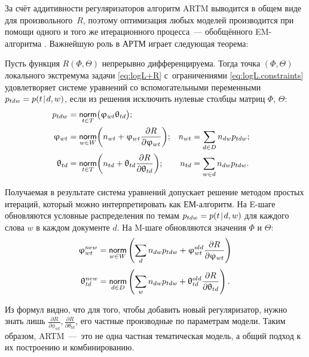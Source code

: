 За счёт аддитивности регуляризаторов алгоритм ARTM  выводится в общем виде для произвольного~$R$, поэтому оптимизация любых моделей  производится при помощи одного и того же итерационного процесса~--- обобщённого EM-алгоритма  \cite{vorontsov2014additive,vorontsov2015}. Важнейшую роль в АРТМ играет следующая теорема:
\begin{Theorem}
\label{th:ARTM}
    Пусть функция $R(\Phi,\Theta)$ непрерывно дифференцируема.
    Тогда точка $(\Phi,\Theta)$ локального экстремума задачи
    \eqref{eq:logL+R} с~ограничениями \eqref{eq:logL.constraints}
    удовлетворяет системе уравнений со вспомогательными переменными $p_{tdw}=p(t\mspace{2mu}{|}\mspace{2mu} d,w)$,
    если из решения исключить нулевые столбцы матриц $\Phi$, $\Theta$:
    \begin{align}
    \label{eq:ARTM.Estep}
        p_{tdw} &=\mathop{\mathsf{norm}}\limits_{t\in T} \bigl( \upvarphi_{wt}\uptheta_{td} \bigr);
    \\\label{eq:ARTM.Mstep.phi}
        \upvarphi_{wt} &=\mathop{\mathsf{norm}}\limits_{w\in W}
            \biggl(
                n_{wt} + \upvarphi_{wt} \frac{\partial R}{\partial \upvarphi_{wt}}
            \biggr);
        &
        n_{wt} &= \sum_{d\in D} n_{dw}p_{tdw};&
    \\\label{eq:ARTM.Mstep.theta}
        \uptheta_{td} &=\mathop{\mathsf{norm}}\limits_{t\in T}
            \biggl(
                n_{td} + \uptheta_{td} \frac{\partial R}{\partial \uptheta_{td}}
            \biggr);
        &
        n_{td} &= \sum_{w\in d} n_{dw}p_{tdw}.&
    \end{align}
\end{Theorem}

Получаемая в результате система уравнений допускает решение методом простых итераций, который можно интерпретировать как ЕМ-алгоритм. На E-шаге обновляются условные распределения по темам $p_{tdw}=p(t\mspace{2mu}{|}\mspace{2mu} d,w)$ для каждого слова $w$ в каждом документе $d$. На M-шаге обновляются значения $\Phi$ и $\Theta$:
\begin{equation} \label{eq:Mstep_Theta}
\upvarphi_{wt}^{new} =\mathop{\mathsf{norm}}\limits_{w\in W} \left( \sum_{d} n_{dw} p_{tdw} + \upvarphi_{wt}^{old} \frac{\partial{R}}{\partial{\ensuremath{\upvarphi}_{wt}}}\right)
\end{equation}
\[
\uptheta_{td}^{new}   =\mathop{\mathsf{norm}}\limits_{d\in D} \left( \sum_{w} n_{dw} p_{tdw} + \uptheta_{td}^{old} \frac{\partial{R}}{\partial{\uptheta_{td}}}\right).
\]
 
Из формул видно, что для того, чтобы добавить новый регуляризатор, нужно знать лишь $\frac{\partial{R}}{\partial{\phi_{wt}}}, \frac{\partial{R}}{\partial{\theta_{td}}}$, его частные производные по параметрам модели. Таким образом, ARTM~---~это не одна частная тематическая модель, а общий подход к их построению и комбинированию.

